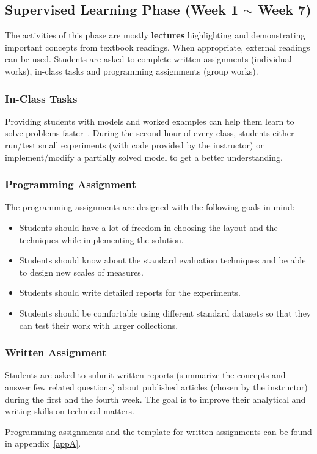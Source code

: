 \documentclass{article}
\begin{document}
\subsection{Supervised Learning Phase (Week 1 $\sim$ Week 7)}
The activities of this phase are mostly {\bf lectures} highlighting and demonstrating important concepts from textbook readings. When appropriate, external readings can be used. Students are asked to complete written assignments (individual works), in-class tasks and programming assignments (group works). 
\subsubsection{In-Class Tasks}
Providing students with models and worked examples can help them learn to solve problems faster~\cite{rosenshine2012principles}. During the second hour of every class, students either run/test small experiments (with code provided by the instructor) or implement/modify a partially solved model to get a better understanding. 


\subsubsection{Programming Assignment}
The programming assignments are designed with the following goals in mind:
\begin{itemize}[noitemsep, nolistsep]
\item Students should have a lot of freedom in choosing the layout and the techniques while implementing the solution. %
\item Students should know about the standard evaluation techniques and be able to design new scales of measures.
\item Students should write detailed reports for the experiments. 
\item Students should be comfortable using different standard datasets so that they can test their work with larger collections.
\end{itemize}
\subsubsection{Written Assignment}
Students are asked to submit written reports (summarize the concepts and answer few related questions) about published articles (chosen by the instructor) during the first and the fourth week. The goal is to improve their analytical and writing skills on technical matters.
\par Programming assignments and the template for written assignments can be found in appendix~\ref{appA}. 
\end{document}
